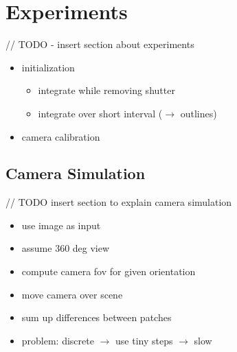 \documentclass[10pt,twocolumn,letterpaper]{article}
\begin{document}
\section{Experiments}

// TODO - insert section about experiments

\begin{itemize}
\item initialization
\begin{itemize}
\item integrate while removing shutter
\item integrate over short interval ($\rightarrow$ outlines)
\end{itemize}
\item camera calibration
\end{itemize}



\subsection{Camera Simulation}

// TODO insert section to explain camera simulation

\begin{itemize}
\item use image as input
\item assume 360 deg view
\item compute camera fov for given orientation
\item move camera over scene
\item sum up differences between patches
\item problem: discrete
	$\rightarrow$ use tiny steps
		$\rightarrow$ slow
\end{itemize}
\end{document}
